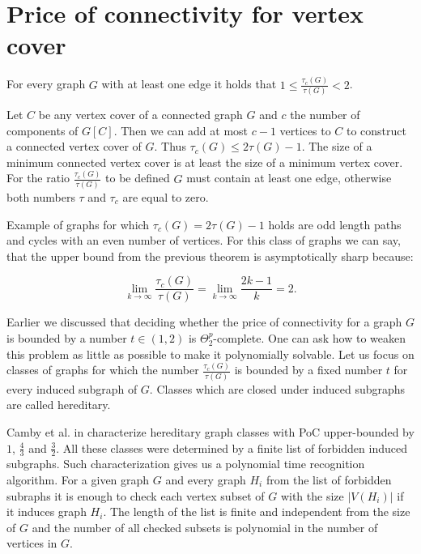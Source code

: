 \chapter{Price of connectivity for vertex cover}\label{chap3}
\begin{thm}\label{pocVC:1}
For every graph \(G\) with at least one edge it holds that \( 1 \leq \frac{\tau_c(G)}{\tau(G)} < 2\).
\end{thm}
\begin{myproof}
	Let \(C\) be any vertex cover of a connected graph \(G\) and \(c\) the number of components of \(G[C]\).
	Then we can add at most \(c - 1\) vertices to \(C\) to construct a connected vertex cover of \(G\).
	Thus \(\tau_c(G) \leq {2\tau(G) - 1}\).
	The size of a minimum connected vertex cover is at least the size of a minimum vertex cover.
	For the ratio \(\frac{\tau_c(G)}{\tau(G)}\) to be defined \(G\) must contain at least one edge, 
	otherwise both numbers \(\tau\) and \(\tau_c\) are equal to zero.
\end{myproof}

Example of graphs for which \(\tau_c(G)= 2\tau(G) - 1\) holds are odd length paths and cycles with an even number of vertices.
For this class of graphs we can say, that the upper bound from the previous theorem is asymptotically sharp because:

\[\lim_{k \to \infty}{\frac{\tau_c(G)}{\tau(G)}} = \lim_{k \to \infty}{\frac{2k - 1}{k}} = 2.\]

Earlier we discussed that deciding whether the price of connectivity for a graph \(G\) is bounded by a number \(t \in (1, 2)\) is \(\Theta^p_2\)-complete.
One can ask how to weaken this problem as little as possible to make it polynomially solvable.
Let us focus on classes of graphs for which the number \(\frac{\tau_c(G)}{\tau(G)}\) is bounded by a fixed number \(t\) for every induced subgraph of \(G\).
Classes which are closed under induced subgraphs are called hereditary.

Camby et al. in \cite{CambyCardinalFioriniSchaudt14} characterize hereditary graph classes with PoC upper-bounded by \(1\), \(\frac{4}{3}\) and \(\frac{3}{2}\).
All these classes were determined by a finite list of forbidden induced subgraphs.
Such characterization gives us a polynomial time recognition algorithm.
For a given graph \(G\) and every graph \(H_i\) from the list of forbidden subraphs it is enough to check each vertex subset of \(G\) with the size \(|V(H_i)|\)
if it induces graph \(H_i\). The length of the list is finite and independent from the size of \(G\) and the number of all checked subsets is polynomial in the number of vertices
in \(G\).

